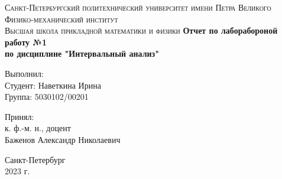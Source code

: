 \documentclass[a4paper,12pt]{article}
\begin{document}
\begin{titlepage}
    \begin{center}
        \textsc{
            Санкт-Петербургский политехнический университет имени Петра Великого \\[5mm]
            Физико-механический институт\\[2mm]
            Высшая школа прикладной математики и физики            
        }   
        \vfill
        \textbf{\large
            Отчет по лаборабороной работу №1\\
            по дисциплине "Интервальный анализ"\\[3mm]
        }                
    \end{center}

    \vfill
    \hfill
    \begin{minipage}{0.5\textwidth}
        Выполнил: \\[2mm]   
		Студент: Наветкина Ирина \\
		Группа: 5030102/00201\\
    \end{minipage}

	\hfill
	\begin{minipage}{0.5\textwidth}
		Принял: \\[2mm]
		к. ф.-м. н., доцент \\   
		Баженов Александр Николаевич
	\end{minipage}

    \vfill
    
    \begin{center}
    Санкт-Петербург\\
    2023 г.\\
    \end{center}
\end{titlepage}

\tableofcontents
\newpage
\end{document}
